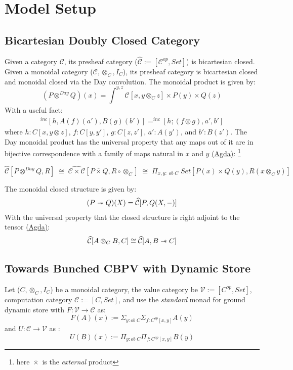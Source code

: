 \documentclass{article}
\newcommand{\sep}{\mathrel{-\mkern-6mu*}}
\newcommand{\pshC}{\widehat{\mathcal{C}}}
\newcommand{\pshCC}{\widehat{\mathcal{C \times C}}}
\newcommand{\dayprod}{\otimes^{Day}}
\begin{document}
\section{Model Setup}
\subsection{Bicartesian Doubly Closed Category}
Given a category $\mathcal{C}$, its presheaf category ($\pshC := [\mathcal{C}^{op}, Set]$)
is bicartesian closed. Given a monoidal category ($\mathcal{C}, \otimes_C , I_C$), 
its presheaf category is bicartesian closed and monoidal closed via the Day convolution. 
The monoidal product is given by:
\[
    (P \dayprod Q)(x) = \int_{}^{y,z} \mathcal{C}[ x , y \otimes_C z ] 
    \times P(y) \times Q(z)
\]
With a useful fact:
\begin{align*}
    ^{inc}[h , A(f)(a'), B(g)(b')] = ^{inc}[h ; (f \otimes g)  , a' , b']
\end{align*} 
where $h : C[x , y \otimes z]$, $f : C[y , y']$, $g : C[z , z']$, $a' : A(y')$, and $b' : B(z')$.
The Day monoidal product has the universal property that any maps out of it are in bijective
correspondence with a family of maps natural in $x$ and $y$ 
\href{https://github.com/bond15/Bunched-CBPV/blob/82136dc6f4f9e4034391877f0d959a6ff1b62dfc/src/Data/BiDCC.agda#L222}
{(Agda)}: 
\footnote{here $\overline{\times}$ is the \textit{external} product}


\[
    \pshC[P \dayprod Q , R] \;\cong \; \pshCC [ P \overline{\times} Q , R \circ \otimes_C ]\; \cong \; \Pi_{x, y : \;ob \;C}\; Set[P(x) \times Q(y) , R(x \otimes_C y)]
\]

The monoidal closed structure is given by: 
\begin{align*}
    (P \sep Q)(X) = \pshC[P , Q(X , -)]
\end{align*}
With the universal property that the closed structure is right adjoint to the tensor
\href{https://github.com/bond15/Bunched-CBPV/blob/82136dc6f4f9e4034391877f0d959a6ff1b62dfc/src/Data/BiDCC.agda#L354}{(Agda)}: 
\begin{align}
    \pshC [ A \otimes_C B , C] \cong \pshC [ A , B \sep C]
\end{align}

\subsection{Towards Bunched CBPV with Dynamic Store}
Let ($C, \otimes_C , I_C$) be a monoidal category, the value category be $\mathcal{V} := [C^{op} , Set]$, 
computation category $\mathcal{C} := [C , Set]$, and use the \textit{standard}
monad for ground dynamic store with $F : \mathcal{V} \rightarrow \mathcal{C}$ as:
\[
    F(A)(x) := \Sigma_{y : ob \;C}\Sigma_{f : C^{op}[ x , y ]}A(y)    
\]
and $U : \mathcal{C} \rightarrow \mathcal{V}$ as :
\[
    U(\underline{B})(x) := \Pi_{y : ob \; C}\Pi_{f : C^{op}[ x , y]}\underline{B}(y)   
\]
\end{document}
